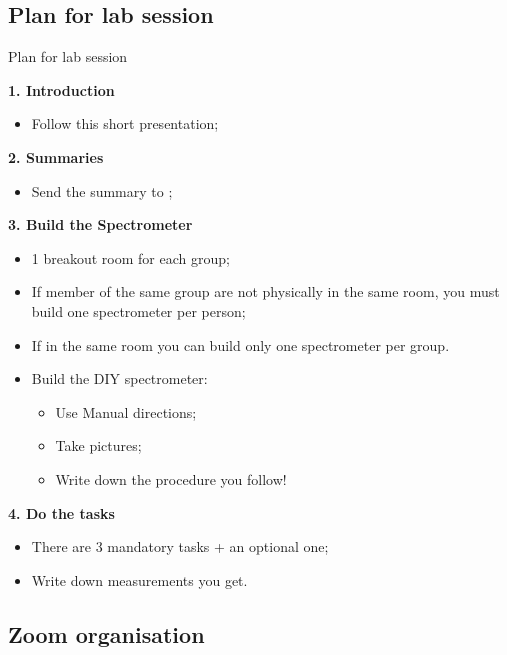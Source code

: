 \documentclass[9pt, xcolor=dvipsnames]{beamer}
\newcommand{\hreff}[3][blue]{\href{#2}{\color{#1}{#3}}}%
\begin{document}
\subsection{Plan for lab session}
\begin{frame}{Plan for lab session}

\textbf{1. Introduction}
\begin{itemize}
	\item Follow this short presentation;
\end{itemize}


\textbf{2. Summaries}

\begin{itemize}
	\item Send the summary to \hreff{mailto:masgalli@phys.ethz.ch}{masgalli@phys.ethz.ch};
\end{itemize}
\textbf{3. Build the Spectrometer}
\begin{itemize}
	\item 1 breakout room for each group;
	\item If member of the same group are not physically in the same room, you must build one spectrometer per person;
	\item If in the same room you can build only one spectrometer per group.
	\item Build the DIY spectrometer:
	\begin{itemize}
	    \item Use Manual directions;
	    \item Take pictures;
	    \item Write down the procedure you follow!
	\end{itemize}
		\end{itemize}

\textbf{4. Do the tasks}

	\begin{itemize}
		\item There are 3 mandatory tasks + an optional one;
		\item Write down measurements you get.
    \end{itemize}


\end{frame}


\subsection{Zoom organisation}
\end{document}
